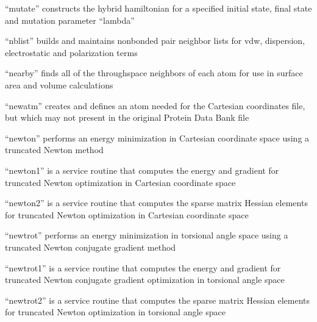 \documentclass[letterpaper,11pt,english]{sphinxmanual}
\begin{document}

“mutate” constructs the hybrid hamiltonian for a specified
initial state, final state and mutation parameter “lambda”


“nblist” builds and maintains nonbonded pair neighbor lists
for vdw, dispersion, electrostatic and polarization terms


“nearby” finds all of the through\sphinxhyphen{}space neighbors of each
atom for use in surface area and volume calculations



“newatm” creates and defines an atom needed for the
Cartesian coordinates file, but which may not present
in the original Protein Data Bank file


“newton” performs an energy minimization in Cartesian
coordinate space using a truncated Newton method


“newton1” is a service routine that computes the energy
and gradient for truncated Newton optimization in Cartesian
coordinate space


“newton2” is a service routine that computes the sparse
matrix Hessian elements for truncated Newton optimization
in Cartesian coordinate space


“newtrot” performs an energy minimization in torsional angle
space using a truncated Newton conjugate gradient method


“newtrot1” is a service routine that computes the energy
and gradient for truncated Newton conjugate gradient
optimization in torsional angle space


“newtrot2” is a service routine that computes the sparse
matrix Hessian elements for truncated Newton optimization
in torsional angle space

\end{document}
